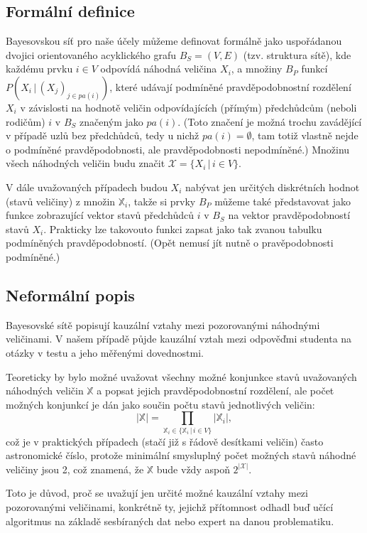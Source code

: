 \documentclass[a4paper,twoside,12pt]{scrbook}
\begin{document}
\subsection{Formální definice}
Bayesovskou síť pro naše účely můžeme definovat formálně jako uspořádanou dvojici orientovaného acyklického grafu $B_S = (V,E)$ (tzv. struktura sítě), kde každému prvku $i \in V$ odpovídá náhodná veličina $X_i$, a množiny $B_P$  funkcí $P(X_i\,|\,(X_j)_{j\in pa(i)})$, které udávají podmíněné pravděpodobnostní rozdělení $X_i$ v závislosti na hodnotě veličin odpovídajících (přímým) předchůdcům (neboli rodičům) $i$ v $B_S$ značeným jako $pa(i)$. (Toto značení je možná trochu zavádějící v případě uzlů bez předchůdců, tedy u nichž $pa(i) = \emptyset$, tam totiž vlastně nejde o podmíněné pravděpodobnosti, ale pravděpodobnosti nepodmíněné.) Množinu všech náhodných veličin budu značit $\mathcal{X}=\{X_i\,|\,i \in V\}$.

V dále uvažovaných případech budou $X_i$ nabývat jen určitých diskrétních hodnot (stavů veličiny) z množin $\mathbb{X}_i$, takže si prvky $B_P$ můžeme také představovat jako funkce zobrazující vektor stavů předchůdců $i$ v $B_S$ na vektor pravděpodobností stavů $X_i$. Prakticky lze takovouto funkci zapsat jako tak zvanou tabulku podmíněných pravděpodobností. (Opět nemusí jít nutně o pravěpodobnosti podmíněné.)

\subsection{Neformální popis}
Bayesovské sítě popisují kauzální vztahy mezi pozorovanými náhodnými veličinami. V našem případě půjde kauzální vztah mezi odpověďmi studenta na otázky v testu a jeho měřenými dovednostmi.

Teoreticky by bylo možné uvažovat všechny možné konjunkce stavů uvažovaných náhodných veličin $\mathbb{X}$ a popsat jejich pravděpodobnostní rozdělení, ale počet možných konjunkcí je dán jako součin počtu stavů jednotlivých veličin:
\begin{equation}
	\label{eq:conjunctions_cardinality}
	|\mathbb{X}| = \prod_{\mathbb{X}_i \in \{\mathbb{X}_i\,|\,i \in V\}} \left|\mathbb{X}_i\right|,
\end{equation}
což je v praktických případech (stačí již s řádově desítkami veličin) často astronomické číslo, protože minimální smysluplný počet možných stavů náhodné veličiny jsou 2, což znamená, že $\mathbb{X}$ bude vždy aspoň $2^{\left|\mathcal{X}\right|}$.

Toto je důvod, proč se uvažují jen určité možné kauzální vztahy mezi pozorovanými veličinami, konkrétně ty, jejichž přítomnost odhadl buď učící algoritmus na základě sesbíraných dat nebo expert na danou problematiku.
\end{document}
